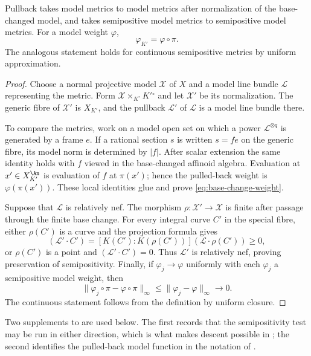 \begin{proposition}\label{prop:base-change-model-metrics}
Pullback takes model metrics to model metrics after normalization of the
base-changed model, and takes semipositive model metrics to semipositive
model metrics.  For a model weight \(\varphi\),
\begin{equation}
\label{eq:base-change-weight}
                    \varphi_{K'}=\varphi\circ\pi.
\end{equation}
The analogous statement holds for continuous semipositive metrics by
uniform approximation.
\end{proposition}
\begin{proof}
Choose a normal projective model $\mathcal X$ of $X$ and a model line bundle
$\mathcal L$ representing the metric.  Form
$\mathcal X\times_{K^\circ}K'{}^\circ$ and let $\mathcal X'$ be its
normalization.  The generic fibre of $\mathcal X'$ is $X_{K'}$, and the
pullback $\mathcal L'$ of $\mathcal L$ is a model line bundle there.

To compare the metrics, work on a model open set on which a power
$\mathcal L^{\otimes q}$ is generated by a frame $e$.  If a rational section
$s$ is written $s=fe$ on the generic fibre, its model norm is determined by
$|f|$.  After scalar extension the same identity holds with $f$ viewed in
the base-changed affinoid algebra.  Evaluation at $x'\in X_{K'}^{\An}$ is
evaluation of $f$ at $\pi(x')$; hence the pulled-back weight is
$\varphi(\pi(x'))$.  These local identities glue and prove
\eqref{eq:base-change-weight}.

Suppose that $\mathcal L$ is relatively nef.  The morphism
$\rho:\mathcal X'\to\mathcal X$ is finite after passage through the finite
base change.  For every integral curve $C'$ in the special fibre, either
$\rho(C')$ is a curve and the projection formula gives
\[
 (\mathcal L'\cdot C')
   =[K(C'):K(\rho(C'))](\mathcal L\cdot\rho(C'))\geq0,
\]
or $\rho(C')$ is a point and $(\mathcal L'\cdot C')=0$.  Thus
$\mathcal L'$ is relatively nef, proving preservation of semipositivity.
Finally, if $\varphi_j\to\varphi$ uniformly with each $\varphi_j$ a
semipositive model weight, then
\[
 \lVert\varphi_j\circ\pi-\varphi\circ\pi\rVert_\infty
 \leq\lVert\varphi_j-\varphi\rVert_\infty\longrightarrow0.
\]
The continuous statement follows from the definition by uniform closure.
\end{proof}

Two supplements to  are used below.
The first records that the semipositivity test may be run in either
direction, which is what makes descent possible in
; the second identifies the pulled-back model
function in the notation of .

